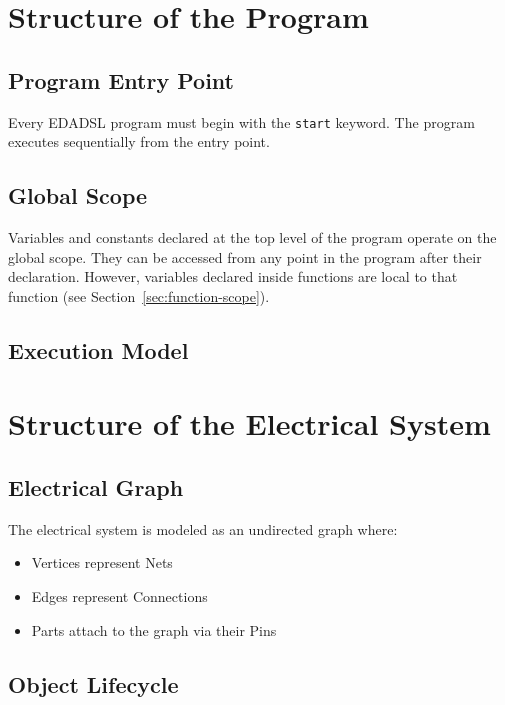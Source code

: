 \chapter{Structure of the Program}

\section{Program Entry Point}
Every EDADSL program must begin with the \texttt{start} keyword. The program executes sequentially from the entry point.

\section{Global Scope}
Variables and constants declared at the top level of the program operate on the global scope. They can be accessed from any point in the program after their declaration. However, variables declared inside functions are local to that function (see Section~\ref{sec:function-scope}).

\section{Execution Model}


\chapter{Structure of the Electrical System}

\section{Electrical Graph}
The electrical system is modeled as an undirected graph where:
\begin{itemize}
\item Vertices represent Nets
\item Edges represent Connections
\item Parts attach to the graph via their Pins
\end{itemize}

\section{Object Lifecycle}


